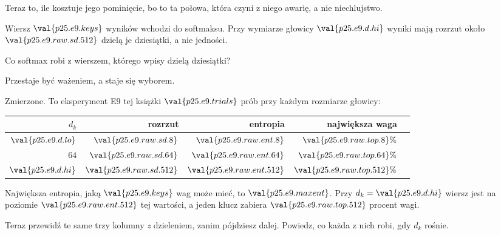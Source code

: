 \begin{fr}
Teraz to, ile kosztuje jego pominięcie, bo to ta połowa, która czyni z niego
awarię, a nie niechlujstwo.

Wiersz $\val{p25.e9.keys}$ wyników wchodzi do softmaksu. Przy wymiarze głowicy
$\val{p25.e9.d.hi}$ wyniki mają rozrzut około
$\val{p25.e9.raw.sd.512}$ \dash{} dzielą je dziesiątki, a nie jedności.

Co softmax robi z wierszem, którego wpisy dzielą dziesiątki?
\dotline
\nextframe
\end{fr}

\begin{fr}
\begin{ansblock}
Przestaje być ważeniem, a staje się wyborem.
\end{ansblock}

Zmierzone. To eksperyment E9 tej książki \dash{} $\val{p25.e9.trials}$ prób
przy każdym rozmiarze głowicy:

\begin{center}
\begin{tabular}{rrrrr}
\toprule
$d_k$ & rozrzut & entropia & największa waga & \\
\midrule
$\val{p25.e9.d.lo}$ & $\val{p25.e9.raw.sd.8}$ & $\val{p25.e9.raw.ent.8}$ &
  $\val{p25.e9.raw.top.8}\%$ & \\
$64$ & $\val{p25.e9.raw.sd.64}$ & $\val{p25.e9.raw.ent.64}$ &
  $\val{p25.e9.raw.top.64}\%$ & \\
$\val{p25.e9.d.hi}$ & $\val{p25.e9.raw.sd.512}$ &
  $\val{p25.e9.raw.ent.512}$ & $\val{p25.e9.raw.top.512}\%$ & \\
\bottomrule
\end{tabular}
\end{center}

Największa entropia, jaką $\val{p25.e9.keys}$ wag może mieć, to
$\val{p25.e9.maxent}$. Przy $d_k = \val{p25.e9.d.hi}$ wiersz jest na poziomie
$\val{p25.e9.raw.ent.512}$ tej wartości, a jeden klucz zabiera
$\val{p25.e9.raw.top.512}$ procent wagi.

Teraz przewidź te same trzy kolumny \emph{z} dzieleniem, zanim pójdziesz dalej.
Powiedz, co każda z nich robi, gdy $d_k$ rośnie.
\dotline
\nextframe
\end{fr}

